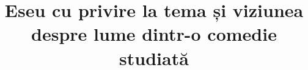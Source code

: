 

\title{Eseu cu privire la tema și viziunea despre lume dintr-o comedie studiată}


 \maketitle %
 

